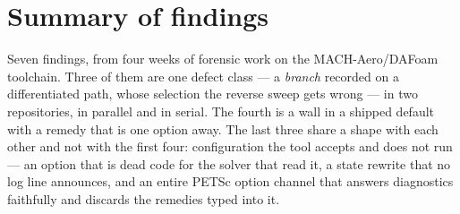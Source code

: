 \documentclass[11pt,a4paper]{article}
\begin{document}
\tableofcontents

\section{Summary of findings}

Seven findings, from four weeks of forensic work on the MACH-Aero/DAFoam toolchain. Three
of them are one defect class --- a \emph{branch} recorded on a differentiated path, whose
selection the reverse sweep gets wrong --- in two repositories, in parallel and in serial.
The fourth is a wall in a shipped default with a remedy that is one option away. The last three
share a shape with each other and not with the first four: configuration the tool accepts and
does not run --- an option that is dead code for the solver that read it, a state rewrite that
no log line announces, and an entire PETSc option channel that answers diagnostics faithfully
and discards the remedies typed into it.
\end{document}
